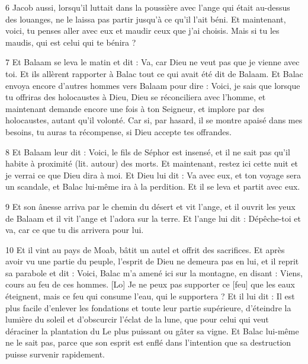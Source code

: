 \par 6 Jacob aussi, lorsqu'il luttait dans la poussière avec l'ange qui était au-dessus des louanges, ne le laissa pas partir jusqu'à ce qu'il l'ait béni. Et maintenant, voici, tu penses aller avec eux et maudir ceux que j'ai choisis. Mais si tu les maudis, qui est celui qui te bénira ?

\par 7 Et Balaam se leva le matin et dit : Va, car Dieu ne veut pas que je vienne avec toi. Et ils allèrent rapporter à Balac tout ce qui avait été dit de Balaam. Et Balac envoya encore d'autres hommes vers Balaam pour dire : Voici, je sais que lorsque tu offriras des holocaustes à Dieu, Dieu se réconciliera avec l'homme, et maintenant demande encore une fois à ton Seigneur, et implore par des holocaustes, autant qu'il volonté. Car si, par hasard, il se montre apaisé dans mes besoins, tu auras ta récompense, si Dieu accepte tes offrandes.

\par 8 Et Balaam leur dit : Voici, le fils de Séphor est insensé, et il ne sait pas qu'il habite à proximité (lit. autour) des morts. Et maintenant, restez ici cette nuit et je verrai ce que Dieu dira à moi. Et Dieu lui dit : Va avec eux, et ton voyage sera un scandale, et Balac lui-même ira à la perdition. Et il se leva et partit avec eux.

\par 9 Et son ânesse arriva par le chemin du désert et vit l'ange, et il ouvrit les yeux de Balaam et il vit l'ange et l'adora sur la terre. Et l'ange lui dit : Dépêche-toi et va, car ce que tu dis arrivera pour lui.

\par 10 Et il vint au pays de Moab, bâtit un autel et offrit des sacrifices. Et après avoir vu une partie du peuple, l'esprit de Dieu ne demeura pas en lui, et il reprit sa parabole et dit : Voici, Balac m'a amené ici sur la montagne, en disant : Viens, cours au feu de ces hommes. [Lo] Je ne peux pas supporter ce [feu] que les eaux éteignent, mais ce feu qui consume l'eau, qui le supportera ? Et il lui dit : Il est plus facile d'enlever les fondations et toute leur partie supérieure, d'éteindre la lumière du soleil et d'obscurcir l'éclat de la lune, que pour celui qui veut déraciner la plantation du Le plus puissant ou gâter sa vigne. Et Balac lui-même ne le sait pas, parce que son esprit est enflé dans l'intention que sa destruction puisse survenir rapidement.


